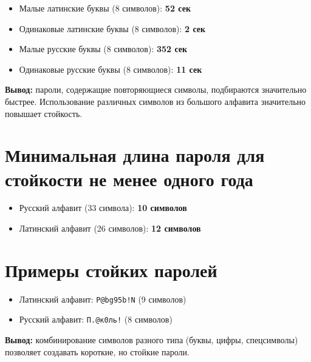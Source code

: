 \documentclass{bsuir}
\begin{document}
\begin{itemize}
	\item Малые латинские буквы (8 символов): \textbf{52 сек}
	\item Одинаковые латинские буквы (8 символов): \textbf{2 сек}
	\item Малые русские буквы (8 символов): \textbf{352 сек}
	\item Одинаковые русские буквы (8 символов): \textbf{11 сек}
\end{itemize}

\textbf{Вывод:} пароли, содержащие повторяющиеся символы, подбираются значительно быстрее. Использование различных символов из большого алфавита значительно повышает стойкость.

\section{Минимальная длина пароля для стойкости не менее одного года}

\begin{itemize}
	\item Русский алфавит (33 символа): \textbf{10 символов}
	\item Латинский алфавит (26 символов): \textbf{12 символов}
\end{itemize}

\section{Примеры стойких паролей}

\begin{itemize}
	\item Латинский алфавит: \texttt{P@bg95b!N} (9 символов)
	\item Русский алфавит: \texttt{П.@к0ль!} (8 символов)
\end{itemize}

\textbf{Вывод:} комбинирование символов разного типа (буквы, цифры, спецсимволы) позволяет создавать короткие, но стойкие пароли.
\end{document}
